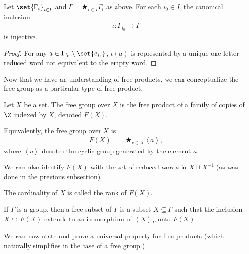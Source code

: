 \documentclass[10pt]{mypackage}
\begin{document}
\begin{corollary}
  Let $\set{\Gamma_i}_{i\in I}$ and $\Gamma = \bigstar_{i\in I}\Gamma_i$ as above. For each $i_0\in I$, the canonical inclusion
  \begin{align*}
    \iota: \Gamma_{i_0}\rightarrow \Gamma
  \end{align*}
  is injective.
\end{corollary}
\begin{proof}
  For any $a\in \Gamma_{i_0}\setminus \set{e_{i_0}}$, $\iota\left(a\right)$ is represented by a unique one-letter reduced word not equivalent to the empty word.
\end{proof}
Now that we have an understanding of free products, we can conceptualize the free group as a particular type of free product.
\begin{definition}
  Let $X$ be a set. The free group over $X$ is the free product of a family of copies of $\Z$ indexed by $X$, denoted $F(X)$.\newline

  Equivalently, the free group over $X$ is
  \begin{align*}
    F(X) &= \bigstar_{a\in X}\left\langle a \right\rangle,
  \end{align*}
  where $\left\langle a \right\rangle$ denotes the cyclic group generated by the element $a$.\newline

  We can also identify $F(X)$ with the set of reduced words in $X\sqcup X^{-1}$ (as was done in the previous subsection).\newline

  The cardinality of $X$ is called the rank of $F(X)$.\newline

  If $\Gamma$ is a group, then a free subset of $\Gamma$ is a subset $X\subseteq \Gamma$ such that the inclusion $X\hookrightarrow F(X)$ extends to an isomorphism of $\left\langle X \right\rangle_{\Gamma}$ onto $F(X)$.
\end{definition}
We can now state and prove a universal property for free products (which naturally simplifies in the case of a free group.)
\end{document}
